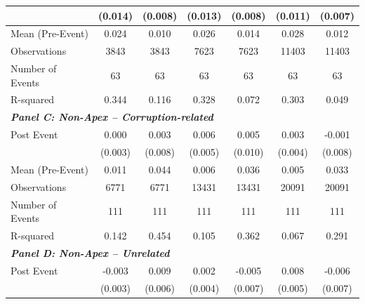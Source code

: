 {\begin{tabular}{l*{6}{c}}
&     (0.014)         &     (0.008)         &     (0.013)         &     (0.008)         &     (0.011)         &     (0.007)         \\
\midrule
Mean (Pre-Event)&       0.024         &       0.010         &       0.026         &       0.014         &       0.028         &       0.012         \\
Observations&        3843         &        3843         &        7623         &        7623         &       11403         &       11403         \\
Number of Events&          63         &          63         &          63         &          63         &          63         &          63         \\
R-squared   &       0.344         &       0.116         &       0.328         &       0.072         &       0.303         &       0.049         \\
\bottomrule
\multicolumn{7}{l}{\textbf{\textit{Panel C: Non-Apex -- Corruption-related}}} \\
Post Event  &       0.000         &       0.003         &       0.006         &       0.005         &       0.003         &      -0.001         \\
&     (0.003)         &     (0.008)         &     (0.005)         &     (0.010)         &     (0.004)         &     (0.008)         \\
\midrule
Mean (Pre-Event)&       0.011         &       0.044         &       0.006         &       0.036         &       0.005         &       0.033         \\
Observations&        6771         &        6771         &       13431         &       13431         &       20091         &       20091         \\
Number of Events&         111         &         111         &         111         &         111         &         111         &         111         \\
R-squared   &       0.142         &       0.454         &       0.105         &       0.362         &       0.067         &       0.291         \\
\bottomrule
\multicolumn{7}{l}{\textbf{\textit{Panel D: Non-Apex -- Unrelated}}} \\
Post Event  &      -0.003         &       0.009         &       0.002         &      -0.005         &       0.008         &      -0.006         \\
&     (0.003)         &     (0.006)         &     (0.004)         &     (0.007)         &     (0.005)         &     (0.007)         \\

\end{tabular}}
